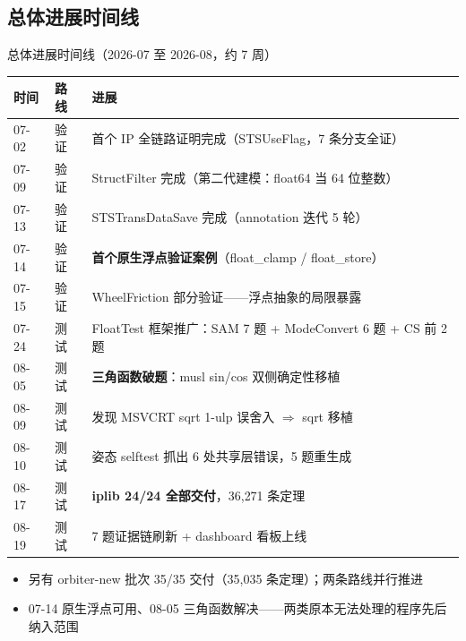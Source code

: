 \documentclass[UTF8,aspectratio=169]{ctexbeamer}
\begin{document}
\subsection{总体进展时间线}
\begin{frame}{总体进展时间线（2026-07 至 2026-08，约 7 周）}
  \centering\footnotesize
  \begin{tabular}{@{}llp{8.2cm}@{}}
    \toprule
    时间 & 路线 & 进展 \\
    \midrule
    07-02 & 验证 & 首个 IP 全链路证明完成（STSUseFlag，7 条分支全证） \\
    07-09 & 验证 & StructFilter 完成（第二代建模：float64 当 64 位整数） \\
    07-13 & 验证 & STSTransDataSave 完成（annotation 迭代 5 轮） \\
    07-14 & 验证 & \textbf{首个原生浮点验证案例}（float\_clamp / float\_store） \\
    07-15 & 验证 & WheelFriction 部分验证——浮点抽象的局限暴露 \\
    07-24 & 测试 & FloatTest 框架推广：SAM 7 题 + ModeConvert 6 题 + CS 前 2 题 \\
    08-05 & 测试 & \textbf{三角函数破题}：musl sin/cos 双侧确定性移植 \\
    08-09 & 测试 & 发现 MSVCRT sqrt 1-ulp 误舍入 $\Rightarrow$ sqrt 移植 \\
    08-10 & 测试 & 姿态 selftest 抓出 6 处共享层错误，5 题重生成 \\
    08-17 & 测试 & \textbf{iplib 24/24 全部交付}，36{,}271 条定理 \\
    08-19 & 测试 & 7 题证据链刷新 + dashboard 看板上线 \\
    \bottomrule
  \end{tabular}
  \vspace{0.8em}
  \begin{itemize}\small
    \item 另有 orbiter-new 批次 35/35 交付（35{,}035 条定理）；两条路线并行推进
    \item 07-14 原生浮点可用、08-05 三角函数解决——两类原本无法处理的程序先后纳入范围
  \end{itemize}
\end{frame}
\end{document}
